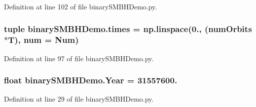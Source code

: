 Definition at line 102 of file binary\-S\-M\-B\-H\-Demo.\-py.

\hypertarget{namespacebinary_s_m_b_h_demo_a4559d154f36f640c55cd7fe2d2be1fa6}{
\subsubsection[{times}]{\setlength{\rightskip}{0pt plus 5cm}tuple binary\-S\-M\-B\-H\-Demo.\-times = np.\-linspace(0., ({\bf num\-Orbits}$\ast${\bf T}), num = {\bf Num})}}\label{namespacebinary_s_m_b_h_demo_a4559d154f36f640c55cd7fe2d2be1fa6}


Definition at line 97 of file binary\-S\-M\-B\-H\-Demo.\-py.

\hypertarget{namespacebinary_s_m_b_h_demo_a0cace76cb6d2734d1d722ab46183b936}{
\subsubsection[{Year}]{\setlength{\rightskip}{0pt plus 5cm}float binary\-S\-M\-B\-H\-Demo.\-Year = 31557600.}}\label{namespacebinary_s_m_b_h_demo_a0cace76cb6d2734d1d722ab46183b936}


Definition at line 29 of file binary\-S\-M\-B\-H\-Demo.\-py.

